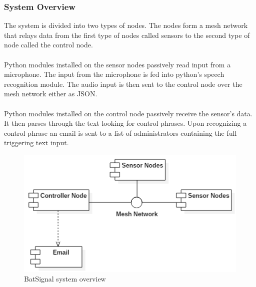 \documentclass[11pt,a4paper]{article}
\begin{document}
\subsubsection{System Overview}
The system is divided into two types of nodes.  The nodes form a mesh network that relays data from the first type of nodes called sensors to the second type of node called the control node. \\\\
Python modules installed on the sensor nodes passively read input from a microphone. The input from the microphone is fed into python's speech recognition module. The audio input is then sent to the control node over the mesh network either as JSON. \\\\
Python modules installed on the control node passively receive the sensor's data.  It then parses through the text looking for control phrases.  Upon recognizing a control phrase an email is sent to a list of administrators containing the full triggering text input.
\begin{figure}[h!]
	\centering
		\includegraphics[scale=0.75, keepaspectratio=true]{Graphics/SimpleOverview.png}
	\caption{BatSignal system overview}
\end{figure}
\end{document}
